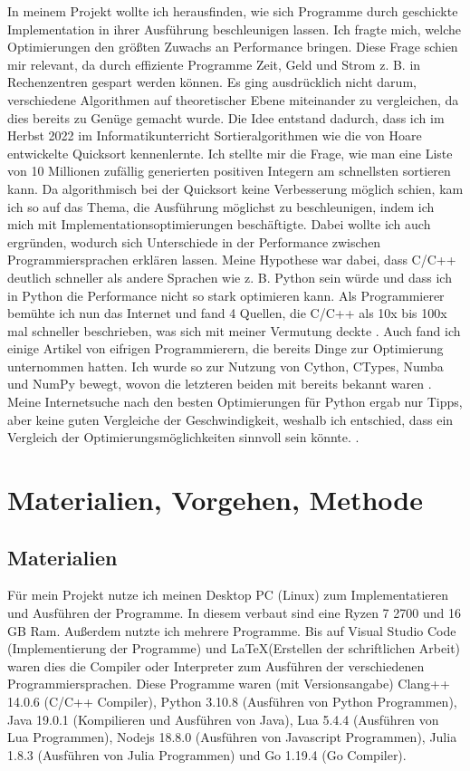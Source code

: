 \documentclass[11pt,a4paper]{article}
\begin{document}
In meinem Projekt wollte ich herausfinden, wie sich Programme durch geschickte Implementation
in ihrer Ausführung beschleunigen lassen. Ich fragte mich, welche Optimierungen den größten Zuwachs
an Performance bringen. Diese Frage schien mir relevant, da durch effiziente Programme Zeit, Geld
und Strom z. B. in Rechenzentren gespart werden können.
Es ging ausdrücklich nicht darum, verschiedene Algorithmen auf theoretischer Ebene
miteinander zu vergleichen, da dies bereits zu Genüge gemacht wurde. \cite{sortieralgorithmenwikipedia}
Die Idee entstand dadurch, dass ich im Herbst 2022 im Informatikunterricht
Sortieralgorithmen wie die von Hoare entwickelte Quicksort kennenlernte. \cite{quicksortwikipedia}
Ich stellte mir die Frage, wie man eine Liste von 10 Millionen zufällig generierten positiven Integern
am schnellsten sortieren kann. Da algorithmisch bei der Quicksort keine Verbesserung möglich schien,
kam ich so auf das Thema, die Ausführung möglichst zu beschleunigen, indem ich mich mit
Implementationsoptimierungen beschäftigte. Dabei wollte ich auch ergründen, wodurch sich Unterschiede
in der Performance zwischen Programmiersprachen erklären lassen. Meine Hypothese war dabei,
dass C/C++ deutlich schneller als andere Sprachen wie z. B. Python sein würde und dass
ich in Python die Performance nicht so stark optimieren kann.  Als Programmierer bemühte ich
nun das Internet und fand 4 Quellen, die C/C++ als 10x bis 100x mal schneller beschrieben,
was sich mit meiner Vermutung deckte \cite{pyengineeringvscpp} \cite{quorepythonvscpp}
\cite{stopythonvscpp}.
Auch fand ich einige Artikel von eifrigen Programmierern, die bereits Dinge zur Optimierung
unternommen hatten. Ich wurde so zur Nutzung von Cython, CTypes, Numba und NumPy bewegt,
wovon die letzteren beiden mit bereits bekannt waren \cite{cythonctypes}.
Meine Internetsuche nach den besten Optimierungen für Python ergab nur Tipps, aber keine
guten Vergleiche der Geschwindigkeit, weshalb ich entschied, dass ein Vergleich der
Optimierungsmöglichkeiten sinnvoll sein könnte.
\cite{pythonopt1} \cite{pythonopt2} \cite{pythonopt3}.

\section{Materialien, Vorgehen, Methode}

\subsection{Materialien}
Für mein Projekt nutze ich meinen Desktop PC (Linux) zum Implementatieren und Ausführen der Programme.
In diesem verbaut sind eine Ryzen 7 2700 und 16 GB Ram. Außerdem nutzte ich mehrere Programme.
Bis auf Visual Studio Code (Implementierung der Programme) und \LaTeX (Erstellen der schriftlichen Arbeit)
waren dies die Compiler oder Interpreter zum Ausführen der verschiedenen Programmiersprachen.
Diese Programme waren (mit Versionsangabe) Clang++ 14.0.6 (C/C++ Compiler), Python 3.10.8 (Ausführen von Python Programmen),
Java 19.0.1 (Kompilieren und Ausführen von Java), Lua 5.4.4 (Ausführen von Lua Programmen),
Nodejs 18.8.0 (Ausführen von Javascript Programmen), Julia 1.8.3 (Ausführen von Julia Programmen)
und Go 1.19.4 (Go Compiler).
\end{document}
